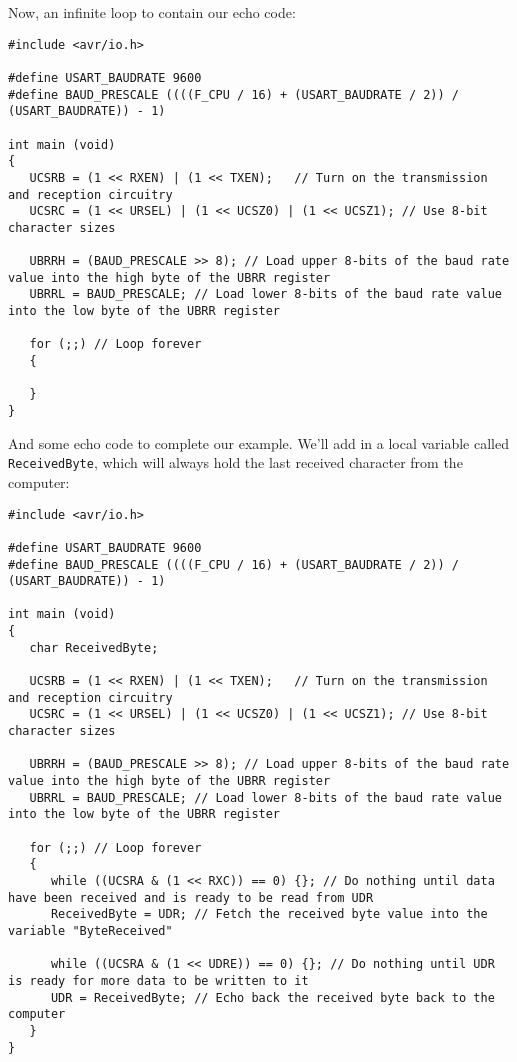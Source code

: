\documentclass[a4paper,oneside,notitlepage]{book}
\begin{document}
Now, an infinite loop to contain our echo code:

\begin{center}
\begin{lstlisting}
#include <avr/io.h>

#define USART_BAUDRATE 9600
#define BAUD_PRESCALE ((((F_CPU / 16) + (USART_BAUDRATE / 2)) / (USART_BAUDRATE)) - 1)

int main (void)
{
   UCSRB = (1 << RXEN) | (1 << TXEN);   // Turn on the transmission and reception circuitry
   UCSRC = (1 << URSEL) | (1 << UCSZ0) | (1 << UCSZ1); // Use 8-bit character sizes

   UBRRH = (BAUD_PRESCALE >> 8); // Load upper 8-bits of the baud rate value into the high byte of the UBRR register
   UBRRL = BAUD_PRESCALE; // Load lower 8-bits of the baud rate value into the low byte of the UBRR register

   for (;;) // Loop forever
   {

   }
}
\end{lstlisting}
\end{center}

And some echo code to complete our example. We'll add in a local variable called \texttt{ReceivedByte}, which will always hold the last received character from the computer:

\begin{center}
\begin{lstlisting}
#include <avr/io.h>

#define USART_BAUDRATE 9600
#define BAUD_PRESCALE ((((F_CPU / 16) + (USART_BAUDRATE / 2)) / (USART_BAUDRATE)) - 1)

int main (void)
{
   char ReceivedByte;

   UCSRB = (1 << RXEN) | (1 << TXEN);   // Turn on the transmission and reception circuitry
   UCSRC = (1 << URSEL) | (1 << UCSZ0) | (1 << UCSZ1); // Use 8-bit character sizes

   UBRRH = (BAUD_PRESCALE >> 8); // Load upper 8-bits of the baud rate value into the high byte of the UBRR register
   UBRRL = BAUD_PRESCALE; // Load lower 8-bits of the baud rate value into the low byte of the UBRR register

   for (;;) // Loop forever
   {
      while ((UCSRA & (1 << RXC)) == 0) {}; // Do nothing until data have been received and is ready to be read from UDR
      ReceivedByte = UDR; // Fetch the received byte value into the variable "ByteReceived"

      while ((UCSRA & (1 << UDRE)) == 0) {}; // Do nothing until UDR is ready for more data to be written to it
      UDR = ReceivedByte; // Echo back the received byte back to the computer
   }
}
\end{lstlisting}
\end{center}
\end{document}
